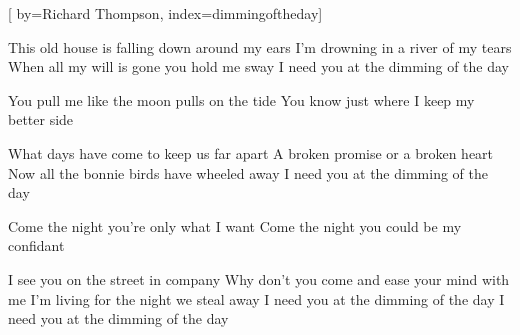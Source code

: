 
[%
    by={Richard Thompson},
    index={dimmingoftheday}]


    \label{dimmingoftheday}

    \beginverse
        This old house is falling down around my ears
        I'm drowning in a river of my tears
        When all my will is gone you hold me sway
        I need you at the dimming of the day

        You pull me like the moon pulls on the tide
        You know just where I keep my better side

        What days have come to keep us far apart
        A broken promise or a broken heart
        Now all the bonnie birds have wheeled away
        I need you at the dimming of the day

        Come the night you're only what I want
        Come the night you could be my confidant

        I see you on the street in company
        Why don't you come and ease your mind with me
        I'm living for the night we steal away
        I need you at the dimming of the day
        I need you at the dimming of the day
    \endverse
\endsong
